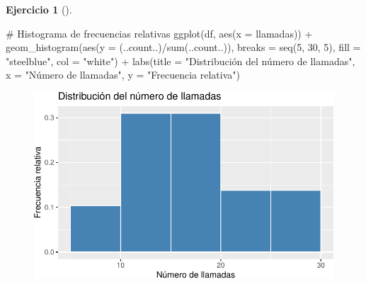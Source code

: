 \documentclass[
  a4paper,
]{scrreport}
\newenvironment{Shaded}{\begin{snugshade}}{\end{snugshade}}
\newcommand{\AttributeTok}[1]{\textcolor[rgb]{0.40,0.45,0.13}{#1}}
\newcommand{\CommentTok}[1]{\textcolor[rgb]{0.37,0.37,0.37}{#1}}
\newcommand{\DecValTok}[1]{\textcolor[rgb]{0.68,0.00,0.00}{#1}}
\newcommand{\FunctionTok}[1]{\textcolor[rgb]{0.28,0.35,0.67}{#1}}
\newcommand{\NormalTok}[1]{\textcolor[rgb]{0.00,0.23,0.31}{#1}}
\newcommand{\SpecialCharTok}[1]{\textcolor[rgb]{0.37,0.37,0.37}{#1}}
\newcommand{\StringTok}[1]{\textcolor[rgb]{0.13,0.47,0.30}{#1}}
\theoremstyle{definition}
\newtheorem{exercise}{Ejercicio}[chapter]
\theoremstyle{remark}
\begin{document}
\begin{exercise}[]
\begin{tcolorbox}
\begin{Shaded}
\begin{Highlighting}[]
\CommentTok{\# Histograma de frecuencias relativas}
\FunctionTok{ggplot}\NormalTok{(df, }\FunctionTok{aes}\NormalTok{(}\AttributeTok{x =}\NormalTok{ llamadas)) }\SpecialCharTok{+}
    \FunctionTok{geom\_histogram}\NormalTok{(}\FunctionTok{aes}\NormalTok{(}\AttributeTok{y =}\NormalTok{ (..count..)}\SpecialCharTok{/}\FunctionTok{sum}\NormalTok{(..count..)), }\AttributeTok{breaks =} \FunctionTok{seq}\NormalTok{(}\DecValTok{5}\NormalTok{, }\DecValTok{30}\NormalTok{, }\DecValTok{5}\NormalTok{), }\AttributeTok{fill =} \StringTok{"steelblue"}\NormalTok{, }\AttributeTok{col =} \StringTok{"white"}\NormalTok{) }\SpecialCharTok{+}
    \FunctionTok{labs}\NormalTok{(}\AttributeTok{title =} \StringTok{"Distribución del número de llamadas"}\NormalTok{, }\AttributeTok{x =} \StringTok{"Número de llamadas"}\NormalTok{, }\AttributeTok{y =} \StringTok{"Frecuencia relativa"}\NormalTok{)}
\end{Highlighting}
\end{Shaded}

\begin{figure}[H]

{\centering \includegraphics{./03-frecuencias-graficos_files/figure-pdf/unnamed-chunk-19-2.pdf}

}

\end{figure}


\end{tcolorbox}
\end{exercise}
\end{document}
